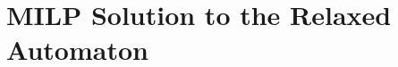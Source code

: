 \documentclass[journal]{IEEEtran}
\newtheorem{exmp}{Example}
\newenvironment{cexmp}
{\addtocounter{exmp}{-1}\begin{exmp}}
  {\end{exmp}}
\begin{document}
\section{MILP Solution to the Relaxed Automaton}\label{sec:solution}
\end{document}
